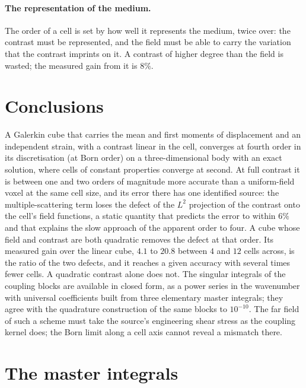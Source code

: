 \documentclass[11pt,a4paper]{article}
\begin{document}
\paragraph{The representation of the medium.} The order of a cell is set by how well it represents the
medium, twice over: the contrast must be represented, and the field must be able to carry the variation
that the contrast imprints on it. A contrast of higher degree than the field is wasted; the measured gain
from it is $8\%$.

\section{Conclusions}\label{sec:summary}

A Galerkin cube that carries the mean and first moments of displacement and an independent strain, with a
contrast linear in the cell, converges at fourth order in its discretisation (at Born order) on a
three-dimensional body with an exact solution, where cells of constant properties converge at second. At
full contrast it is between one and two orders of magnitude more accurate than a uniform-field voxel at
the same cell size, and its error there has one identified source: the multiple-scattering term loses the
defect of the $L^2$ projection of the contrast onto the cell's field functions, a static quantity that
predicts the error to within $6\%$ and that explains the slow approach of the apparent order to four. A
cube whose field and contrast are both quadratic removes the defect at that order. Its measured gain over
the linear cube, $4.1$ to $20.8$ between $4$ and $12$ cells across, is the ratio of the two defects, and
it reaches a given accuracy with several times fewer cells. A quadratic contrast alone does not.
The singular integrals of the coupling blocks are available in closed form, as a power series in the
wavenumber with universal coefficients built from three elementary master integrals; they agree with the
quadrature construction of the same blocks to $10^{-10}$. The far field of such a scheme must take the source's
engineering shear stress as the coupling kernel does; the Born limit along a cell axis cannot reveal a
mismatch there.

\appendix
{}
\renewcommand{\thetable}{\thesection.\arabic{table}}
\makeatletter{}\makeatother

\section{The master integrals}\label{app:master}
\end{document}
